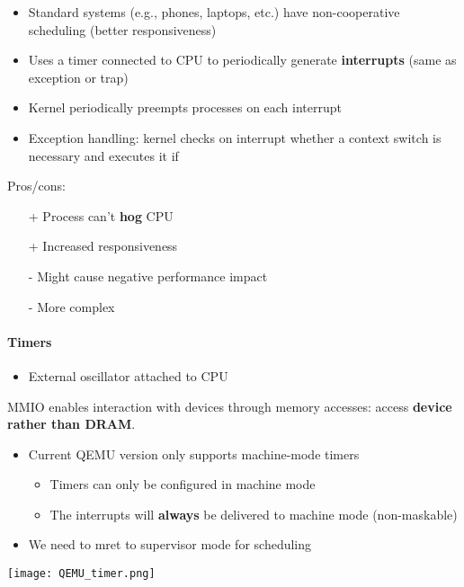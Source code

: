 \begin{itemize}
    \item Standard systems (e.g., phones, laptops, etc.) have non-cooperative scheduling (better responsiveness)
    \item Uses a timer connected to CPU to periodically generate \textbf{interrupts} (same as exception or trap)
    \item Kernel periodically preempts processes on each interrupt
    \item Exception handling: kernel checks on interrupt whether a context switch is necessary and executes it if 
\end{itemize}
Pros/cons:
\begin{itemize}
    \item[+] Process can't \textbf{hog} CPU
    \item[+] Increased responsiveness
    \item[-] Might cause negative performance impact
    \item[-] More complex
\end{itemize}

\paragraph{Timers}
\begin{itemize}
    \item External oscillator attached to CPU
\end{itemize}


MMIO enables interaction with devices through memory accesses: access \textbf{device rather than DRAM}.


\begin{itemize}
    \item Current QEMU version only supports machine-mode timers
    \begin{itemize}
        \item Timers can only be configured in machine mode
        \item The interrupts will \textbf{always} be delivered to machine mode (non-maskable)
    \end{itemize}
    \item We need to mret to supervisor mode for scheduling
\end{itemize}
\begin{center}
    \texttt{[image: QEMU\_timer.png]}
\end{center}


